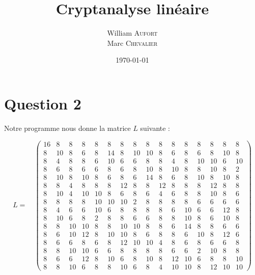 

\title{Cryptanalyse linéaire}
\author{
    William \textsc{Aufort}\\
    Marc \textsc{Chevalier}
}
\date{\today}


\maketitle

\section*{Question 2}

Notre programme nous donne la matrice $L$ suivante :

\setcounter{MaxMatrixCols}{16}
\[ L = \quad \begin{pmatrix}
16 & 8 & 8 & 8 & 8 & 8 & 8 & 8 & 8 & 8 & 8 & 8 & 8 & 8 & 8 & 8 \\
8 & 10 & 8 & 6 & 8 & 14 & 8 & 10 & 10 & 8 & 6 & 8 & 6 & 8 & 10 & 8 \\
8 & 4 & 8 & 8 & 6 & 10 & 6 & 6 & 8 & 8 & 4 & 8 & 10 & 10 & 6 & 10 \\
8 & 6 & 8 & 6 & 6 & 8 & 6 & 8 & 10 & 8 & 10 & 8 & 8 & 10 & 8 & 2 \\
8 & 10 & 8 & 10 & 8 & 6 & 8 & 6 & 14 & 8 & 6 & 8 & 10 & 8 & 10 & 8 \\
8 & 8 & 4 & 8 & 8 & 8 & 12 & 8 & 8 & 12 & 8 & 8 & 8 & 12 & 8 & 8 \\
8 & 10 & 4 & 10 & 10 & 8 & 6 & 8 & 6 & 4 & 6 & 8 & 8 & 10 & 8 & 6 \\
8 & 8 & 8 & 8 & 10 & 10 & 10 & 2 & 8 & 8 & 8 & 8 & 6 & 6 & 6 & 6 \\
8 & 4 & 6 & 6 & 10 & 6 & 8 & 8 & 8 & 8 & 6 & 10 & 6 & 6 & 12 & 8 \\
8 & 10 & 6 & 8 & 2 & 8 & 8 & 6 & 6 & 8 & 8 & 10 & 8 & 6 & 10 & 8 \\
8 & 8 & 10 & 10 & 8 & 8 & 10 & 10 & 8 & 8 & 6 & 14 & 8 & 8 & 6 & 6 \\
8 & 6 & 10 & 12 & 8 & 10 & 10 & 8 & 6 & 8 & 8 & 6 & 10 & 8 & 12 & 6 \\
8 & 6 & 6 & 8 & 6 & 8 & 12 & 10 & 10 & 4 & 8 & 6 & 8 & 6 & 6 & 8 \\
8 & 8 & 10 & 10 & 6 & 6 & 8 & 8 & 8 & 8 & 6 & 6 & 2 & 10 & 8 & 8 \\
8 & 6 & 6 & 12 & 8 & 10 & 6 & 8 & 10 & 8 & 12 & 10 & 6 & 8 & 8 & 10 \\
8 & 8 & 10 & 6 & 8 & 8 & 10 & 6 & 8 & 4 & 10 & 10 & 8 & 12 & 10 & 10

\end{pmatrix}\]

